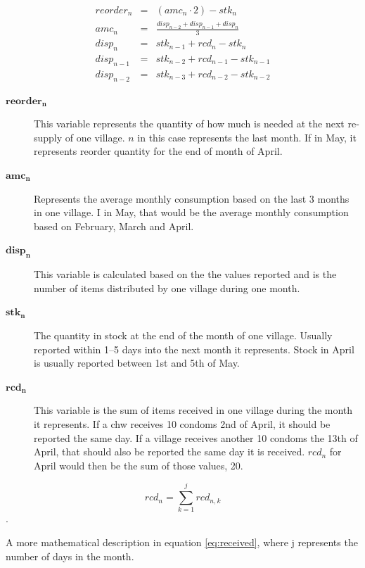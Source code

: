 \begin{eqnarray}
reorder_{n} & = & (amc_{n} \cdot 2) - stk_{n} \\
amc_{n} & = & \frac{disp_{n-2} + disp_{n-1} + disp_{n}}{3} \\
disp_{n} & = & stk_{n-1} + rcd_{n} - stk_{n} \\
disp_{n-1} & = & stk_{n-2} + rcd_{n-1} - stk_{n-1} \\
disp_{n-2} & = & stk_{n-3} + rcd_{n-2} - stk_{n-2}
\end{eqnarray}


\begin{description}
\item[$\mathbf{reorder_{n}}$]
This variable represents the quantity of how much is needed at the next re-supply of one village. $n$ in this case represents the last month. If in May, it represents reorder quantity for the end of month of April.
\item[$\mathbf{amc_{n}}$]
Represents the average monthly consumption based on the last 3 months in one village. I in May, that would be the average monthly consumption based on February, March and April.
\item[$\mathbf{disp_{n}}$]
This variable is calculated based on the the values reported and is the number of items distributed by one village during one month.
\item[$\mathbf{stk_{n}}$]
The quantity in stock at the end of the month of one village. Usually reported within 1--5 days into the next month it represents. Stock in April is usually reported between 1st and 5th of May.
\item[$\mathbf{rcd_{n}}$]
This variable is the sum of items received in one village during the month it represents. If a \gls{chw} receives 10 condoms 2nd of April, it should be reported the same day. If a village receives another 10 condoms the 13th of April, that should also be reported the same day it is received. $rcd_{n}$ for April would then be the sum of those values, 20.
\end{description}

\begin{equation}
rcd_{n} = \sum_{k = 1}^{j} rcd_{n,k}
\label{eq:received}
\end{equation}.

A more mathematical description in equation \ref{eq:received}, where j represents the number of days in the month.






